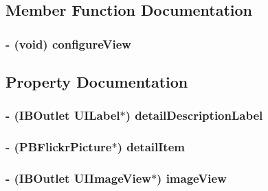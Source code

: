 \subsection{Member Function Documentation}
\hypertarget{interface_p_b_detail_view_controller_a6e444291096074b0a91839b7c0b2d78a}{
\subsubsection[{configureView}]{\setlength{\rightskip}{0pt plus 5cm}-\/ (void) configureView }}
\label{interface_p_b_detail_view_controller_a6e444291096074b0a91839b7c0b2d78a}


\subsection{Property Documentation}
\hypertarget{interface_p_b_detail_view_controller_a1504b315f71021c7e20ff327f03b4c62}{
\subsubsection[{detailDescriptionLabel}]{\setlength{\rightskip}{0pt plus 5cm}-\/ (IBOutlet UILabel$\ast$) detailDescriptionLabel}}
\label{interface_p_b_detail_view_controller_a1504b315f71021c7e20ff327f03b4c62}
\hypertarget{interface_p_b_detail_view_controller_a0c5678bf65a5025c6f30ca0a7b5ce1e4}{
\subsubsection[{detailItem}]{\setlength{\rightskip}{0pt plus 5cm}-\/ ({\bf PBFlickrPicture}$\ast$) detailItem}}
\label{interface_p_b_detail_view_controller_a0c5678bf65a5025c6f30ca0a7b5ce1e4}
\hypertarget{interface_p_b_detail_view_controller_adee2c301578c99fb57f38994799e641e}{
\subsubsection[{imageView}]{\setlength{\rightskip}{0pt plus 5cm}-\/ (IBOutlet UIImageView$\ast$) imageView}}
